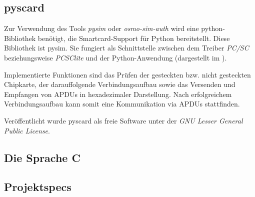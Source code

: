\subsection{pyscard}
Zur Verwendung des Tools \textit{pysim} oder \textit{osmo-sim-auth} wird eine python-Bibliothek benötigt,
die Smartcard-Support für Python bereitstellt. Diese Bibliothek
ist pysim. Sie fungiert als Schnittstelle zwischen dem Treiber \textit{PC/SC}
beziehungsweise \textit{PCSClite} und der Python-Anwendung 
(dargestellt im ).

Implementierte Funktionen sind das Prüfen der gesteckten bzw. nicht gesteckten
Chipkarte, der darauffolgende Verbindungsaufbau sowie das Versenden und
Empfangen von APDUs in hexadezimaler Darstellung.
Nach erfolgreichem Verbindungsaufbau kann somit eine Kommunikation via
APDUs stattfinden.

Veröffentlicht wurde pyscard als freie Software unter der
\textit{GNU Lesser General Public License}.


\subsection{Die Sprache C}

\subsection{Projektspecs}
